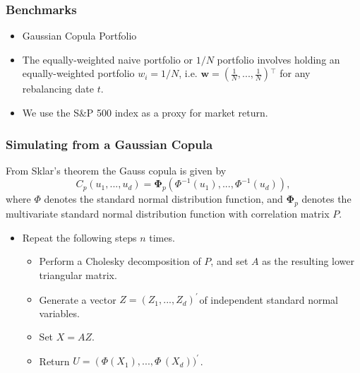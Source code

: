\documentclass[pdf,10pt,xcolor=dvipsnames,hide notes]{beamer}
\begin{document}
\begin{frame}[label=frame7]
\frametitle{Benchmarks}

\begin{itemize}
\justifying
\item Gaussian Copula Portfolio

\vspace{0.3cm}

\item The equally-weighted naive portfolio or $1/N$ portfolio involves holding an equally-weighted portfolio $w_{i} = 1/N$, i.e. $\mathbf{w=}\left( \frac{1}{N},...,\frac{1}{N}\right) {^{\top }}$ for
any rebalancing date $t$.

\vspace{0.3cm}

\item We use the S\&P 500 index as a proxy for market return.


\end{itemize}

\end{frame}

\begin{frame}[label=frame7]
\frametitle{Simulating from a Gaussian Copula}

From Sklar's theorem the Gauss copula is given by \begin{equation}C_{p}\left (u_{1} , . . . ,u_{d}\right ) =\mathbf{\Phi }_{p}\left (\Phi ^{ -1}(u_{1}) , . . . ,\Phi ^{ -1}(u_{d})\right ) ,
\end{equation}where $\Phi $ denotes the standard normal distribution function, and $\mathbf{\Phi }_{p}$ denotes the multivariate standard normal distribution function with correlation matrix $P .$

\vspace{0.3cm}

\begin{itemize}
	\justifying
	\item Repeat the following steps $n$ times.
	
	\begin{itemize}
	\item Perform a Cholesky decomposition of $P$, and set $A$ as the resulting lower triangular matrix.
	
	\vspace{0.3cm}
	
	\item Generate a vector $Z =\left (Z_{1} , . . . ,Z_{d}\right )^{ \prime ^{\,}}$of independent standard normal variables.
	
	\vspace{0.3cm}
	
	\item Set $X =AZ$.
	
	\vspace{0.3cm}
	
	\item Return $U =\left (\Phi (X_{1})\right . , . . . ,\Phi ^{\,}(X_{d}))^{ \prime ^{\,}}$.
	\end{itemize}
	
	
\end{itemize}

\end{frame}
\end{document}
